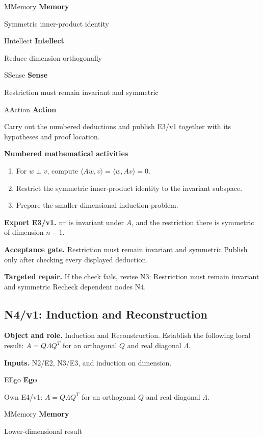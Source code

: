 \documentclass[preprint,12pt,aps,pra,showkeys,amsmath,amssymb,superscriptaddress,floatfix]{revtex4-2}
\theoremstyle{definition}
\theoremstyle{remark}
\newcommand{\mmfaculty}[3]{%
 \begin{mmfacultybox}{#1}{#2}
 {\sffamily\bfseries\color{MMBlue}#2}\par\smallskip #3
 \end{mmfacultybox}}
\newcommand{\field}[2]{\par\smallskip\noindent\textbf{#1.} #2\par}
\begin{document}
\mmfaculty{M}{Memory}{Symmetric inner-product identity}

\mmfaculty{I}{Intellect}{Reduce dimension orthogonally}

\mmfaculty{S}{Sense}{Restriction must remain invariant and symmetric}

\mmfaculty{A}{Action}{Carry out the numbered deductions and publish E3/v1 together with its
hypotheses and proof location.}

\smallskip\noindent\textbf{Numbered mathematical activities}

\begin{enumerate}[label=N3.\arabic*,leftmargin=3.4em]

\item For \(w\perp v\), compute \(\langle Aw,v\rangle=\langle w,Av\rangle=0\).

\item Restrict the symmetric inner-product identity to the invariant subspace.

\item Prepare the smaller-dimensional induction problem.

\end{enumerate}

\field{Export E3/v1}{\(v^\perp\) is invariant under \(A\), and the restriction there is
symmetric of dimension \(n-1\).}

\field{Acceptance gate}{Restriction must remain invariant and symmetric Publish only after
checking every displayed deduction.}

\field{Targeted repair}{If the check fails, revise N3: Restriction must remain invariant and
symmetric Recheck dependent nodes N4.}

\clearpage

\subsection{N4/v1: Induction and Reconstruction}

\field{Object and role}{Induction and Reconstruction. Establish the following local result:
\(A=Q\Lambda Q^T\) for an orthogonal \(Q\) and real diagonal
\(\Lambda\).}

\field{Inputs}{N2/E2, N3/E3, and induction on dimension.}

\mmfaculty{E}{Ego}{Own E4/v1: \(A=Q\Lambda Q^T\) for an orthogonal \(Q\) and real diagonal
\(\Lambda\).}

\mmfaculty{M}{Memory}{Lower-dimensional result}
\end{document}
